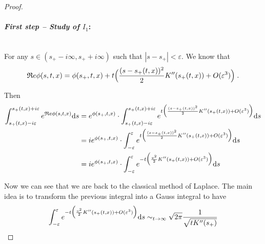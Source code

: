 \documentclass[11pt]{amsart}
\renewcommand{\Re}{\mathfrak{R}e}
\begin{document}
\begin{proof}
\paragraph{\textit{First step -- Study of $I_1$}:}\mbox{}\\
For any $s \in (s_+ - i \infty, s_+ + i \infty)$ such that $|s - s_+| < \varepsilon$.
We know that 
    \begin{equation}
        \Re \phi(s, t, x) = \phi(s_+, t, x) + t \Big(\frac{(s - s_+(t,x))^2}{2} K''(s_+(t,x)) + O(\varepsilon^3)\Big)
        \eqfinp
    \end{equation}

Then 
\begin{align*}
   \int_{s_+(t,x) - i\varepsilon}^{s_+(t,x) + i\varepsilon} e^{\Re \phi(s,t,x)} \ds
    &=
    e^{\phi(s_+, t, x)} \cdot \int_{s_+(t,x) - i\varepsilon}^{s_+(t,x) + i\varepsilon} e^{t \Big(\frac{(s - s_+(t,x))^2}{2} K''(s_+(t,x)) + O(\varepsilon^3)\Big)} \ds \\
    &= 
     i e^{\phi(s_+, t, x)} \cdot \int_{- \varepsilon}^{\varepsilon} e^{t \Big(\frac{(s - s_+(t,x))^2}{2} K''(s_+(t,x)) + O(\varepsilon^3)\Big)} \ds \\
    &= 
     i e^{\phi(s_+, t, x)} \cdot \int_{- \varepsilon}^{\varepsilon} e^{- t \Big(\frac{v^2}{2} K''(s_+(t,x)) + O(\varepsilon^3)\Big)} \ds 
\end{align*}

Now we can see that we are back to the classical method of Laplace. The main idea is to transform the previous integral into a Gauss integral to have
    \begin{equation}
    \int_{- \varepsilon}^{\varepsilon} e^{- t \Big(\frac{v^2}{2} K''(s_+(t,x)) + O(\varepsilon^3)\Big)} \mathrm ds 
    \sim_{t \to \infty}
    \sqrt{2\pi} \frac{1}{\sqrt{tK''(s_+)}}
    \end{equation}
    

\end{proof}
\end{document}
